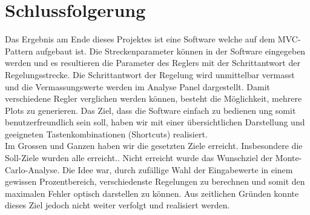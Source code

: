 \section{Schlussfolgerung}
Das Ergebnis am Ende dieses Projektes ist eine Software welche auf dem MVC-Pattern aufgebaut ist. Die Streckenparameter können in der Software eingegeben werden und es resultieren die Parameter des Reglers mit der Schrittantwort der Regelungsstrecke. Die Schrittantwort der Regelung wird unmittelbar vermasst und die Vermassungswerte werden im Analyse Panel dargestellt. Damit verschiedene Regler verglichen werden können, besteht die Möglichkeit, mehrere Plots zu generieren. Das Ziel, dass die Software einfach zu bedienen ung somit benutzerfreundlich sein soll, haben wir mit einer übersichtlichen Darstellung und geeigneten Tastenkombinationen (Shortcuts) realisiert.\\
Im Grossen und Ganzen haben wir die gesetzten Ziele erreicht. Insbesondere die Soll-Ziele wurden alle erreicht.. Nicht erreicht wurde das Wunschziel der Monte-Carlo-Analyse. Die Idee war, durch zufällige Wahl der Eingabewerte in einem gewissen Prozentbereich, verschiedenste Regelungen zu berechnen und somit den maximalen Fehler optisch darstellen zu können. Aus zeitlichen Gründen konnte dieses Ziel jedoch nicht weiter verfolgt und realisiert werden.